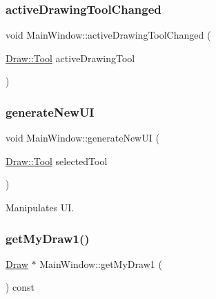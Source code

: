 \subsubsection{\texorpdfstring{active\+Drawing\+Tool\+Changed}{activeDrawingToolChanged}}
{\footnotesize\ttfamily void Main\+Window\+::active\+Drawing\+Tool\+Changed (\begin{DoxyParamCaption}\item[{\hyperlink{class_draw_aef97a848de7a634c35c3ce678be88b9b}{Draw\+::\+Tool}}]{active\+Drawing\+Tool }\end{DoxyParamCaption})\hspace{0.3cm}{\ttfamily [signal]}}

\mbox{\label{class_main_window_a91d63c0ae1ebabef78c51f976b763deb}} 
\subsubsection{\texorpdfstring{generate\+New\+UI}{generateNewUI}}
{\footnotesize\ttfamily void Main\+Window\+::generate\+New\+UI (\begin{DoxyParamCaption}\item[{\hyperlink{class_draw_aef97a848de7a634c35c3ce678be88b9b}{Draw\+::\+Tool}}]{selected\+Tool }\end{DoxyParamCaption})\hspace{0.3cm}{\ttfamily [slot]}}



Manipulates UI. 

\mbox{\label{class_main_window_a6532642576d372d482fe65a75f1b3625}} 
\subsubsection{\texorpdfstring{get\+My\+Draw1()}{getMyDraw1()}}
{\footnotesize\ttfamily \hyperlink{class_draw}{Draw} $\ast$ Main\+Window\+::get\+My\+Draw1 (\begin{DoxyParamCaption}{ }\end{DoxyParamCaption}) const}

\mbox{\label{class_main_window_a03e97a4c381756e59848495721bff9be}} 
